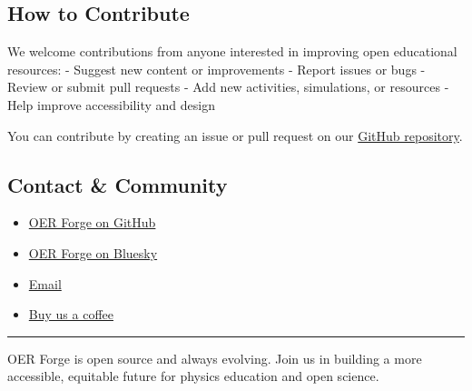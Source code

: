\subsection{How to Contribute}\label{how-to-contribute}

We welcome contributions from anyone interested in improving open
educational resources: - Suggest new content or improvements - Report
issues or bugs - Review or submit pull requests - Add new activities,
simulations, or resources - Help improve accessibility and design

You can contribute by creating an issue or pull request on our
\href{https://github.com/open-physics-ed/open-physics-ed-org.github.io}{GitHub
repository}.

\subsection{Contact \& Community}\label{contact-community}

\begin{itemize}
\tightlist
\item
  \href{https://github.com/OER-Forge}{OER Forge on GitHub}
\item
  \href{https://bsky.app/profile/oerforge.org}{OER Forge on Bluesky}
\item
  \href{mailto:hello@oerforge.org}{Email}
\item
  \href{https://www.buymeacoffee.com/dannycab}{Buy us a coffee}
\end{itemize}

\begin{center}\rule{0.5\linewidth}{0.5pt}\end{center}

OER Forge is open source and always evolving. Join us in building a more
accessible, equitable future for physics education and open science.
